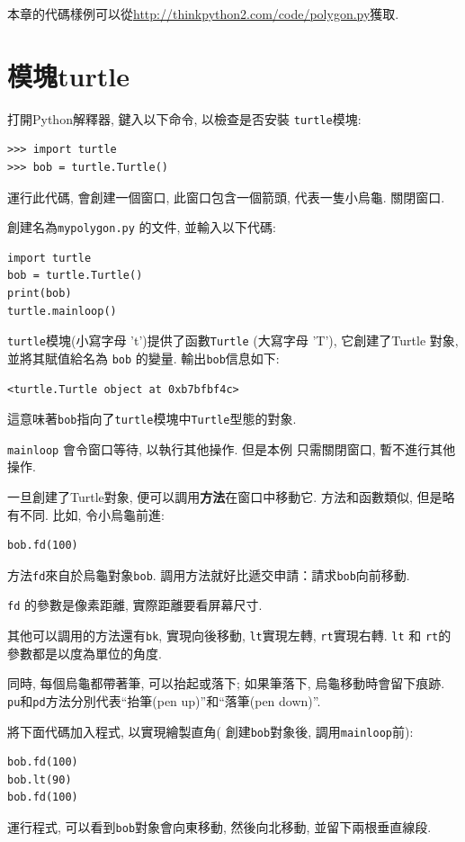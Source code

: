 \documentclass[10pt]{book}
\begin{document}
本章的代碼樣例可以從\url{http://thinkpython2.com/code/polygon.py}獲取. 


\section{模塊turtle}
\label{turtle}

打開Python解釋器, 鍵入以下命令, 以檢查是否安裝 {\tt turtle}模塊:

\begin{verbatim}
>>> import turtle
>>> bob = turtle.Turtle()
\end{verbatim}

運行此代碼, 會創建一個窗口, 此窗口包含一個箭頭, 代表一隻小烏龜. 
關閉窗口. 

創建名為{\tt mypolygon.py} 的文件, 並輸入以下代碼:

\begin{verbatim}
import turtle
bob = turtle.Turtle()
print(bob)
turtle.mainloop()
\end{verbatim}
%
 {\tt turtle}模塊(小寫字母 't')提供了函數{\tt Turtle} (大寫字母 'T'), 
它創建了Turtle 對象, 並將其賦值給名為 {\tt bob} 的變量. 
輸出{\tt bob}信息如下:

\begin{verbatim}
<turtle.Turtle object at 0xb7bfbf4c>
\end{verbatim}
%
這意味著{\tt bob}指向了{\tt turtle}模塊中{\tt Turtle}型態的對象.

\verb"mainloop" 會令窗口等待, 以執行其他操作. 但是本例
只需關閉窗口, 暫不進行其他操作. 

一旦創建了Turtle對象, 便可以調用{\bf 方法}在窗口中移動它. 
方法和函數類似, 但是略有不同. 比如, 令小烏龜前進:

\begin{verbatim}
bob.fd(100)
\end{verbatim}
%
方法{\tt fd}來自於烏龜對象{\tt bob}. 
調用方法就好比遞交申請：請求{\tt bob}向前移動. 

{\tt fd} 的參數是像素距離, 實際距離要看屏幕尺寸. 

其他可以調用的方法還有{\tt bk}, 實現向後移動, 
{\tt lt}實現左轉, {\tt rt}實現右轉. 
{\tt lt} 和 {\tt rt}的參數都是以度為單位的角度. 

同時, 每個烏龜都帶著筆, 可以抬起或落下;
如果筆落下, 烏龜移動時會留下痕跡. 
{\tt pu}和{\tt pd}方法分別代表``抬筆(pen up)''和``落筆(pen down)''.

將下面代碼加入程式, 以實現繪製直角(
創建{\tt bob}對象後, 調用\verb"mainloop"前):

\begin{verbatim}
bob.fd(100)
bob.lt(90)
bob.fd(100)
\end{verbatim}
%
運行程式, 可以看到{\tt bob}對象會向東移動, 然後向北移動, 並留下兩根垂直線段. 
\end{document}
